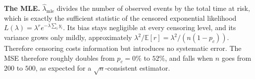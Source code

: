 \documentclass[11pt,a4paper]{article}
\begin{document}
\textbf{The MLE.} $\hat{\lambda}_{\text{mle}}$ divides the number of observed events by the total time at
risk, which is exactly the sufficient statistic of the censored exponential likelihood
$L(\lambda) = \lambda^{r} e^{-\lambda \sum_i y_i}$. Its bias stays negligible at every censoring level,
and its variance grows only mildly, approximately $\lambda^2 / \mathbb{E}[r] = \lambda^2 / (n(1-p_c))$.
Therefore censoring costs information but introduces no systematic error. The
MSE therefore roughly doubles from $p_c = 0\%$ to $52\%$, and falls when $n$ goes from $200$ to $500$,
as expected for a $\sqrt{n}$-consistent estimator.



\newpage
\end{document}
